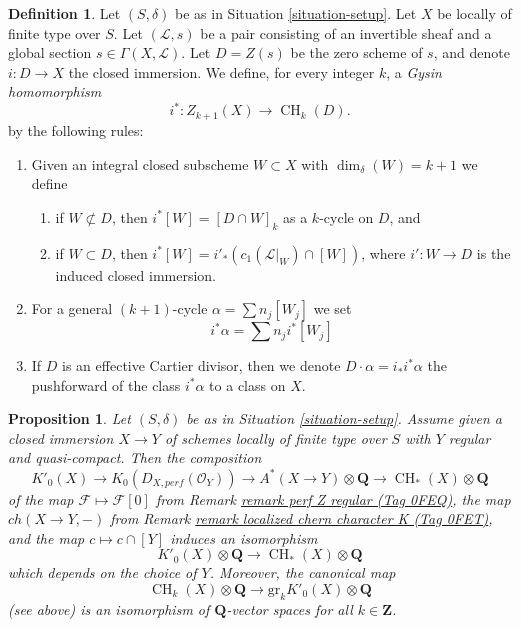 \documentclass{amsart}
\theoremstyle{plain}
\newtheorem{proposition}[subsection]{Proposition}
\theoremstyle{definition}
\newtheorem{definition}[subsection]{Definition}
\theoremstyle{remark}
\numberwithin{equation}{subsection}
\def\CH{\mathop{\mathrm{CH}}\nolimits}
\begin{document}
\begin{definition}
\label{definition-gysin-homomorphism}
Let $(S, \delta)$ be as in Situation \ref{situation-setup}.
Let $X$ be locally of finite type over $S$.
Let $(\mathcal{L}, s)$ be a pair consisting of an invertible
sheaf and a global section $s \in \Gamma(X, \mathcal{L})$.
Let $D = Z(s)$ be the zero scheme of $s$, and
denote $i : D \to X$ the closed immersion.
We define, for every integer $k$, a {\it Gysin homomorphism}
$$
i^* : Z_{k + 1}(X) \to \CH_k(D).
$$
by the following rules:
\begin{enumerate}
\item Given an integral closed subscheme $W \subset X$ with
$\dim_\delta(W) = k + 1$ we define
\begin{enumerate}
\item if $W \not \subset D$, then $i^*[W] = [D \cap W]_k$ as a
$k$-cycle on $D$, and
\item if $W \subset D$, then
$i^*[W] = i'_*(c_1(\mathcal{L}|_W) \cap [W])$,
where $i' : W \to D$ is the induced closed immersion.
\end{enumerate}
\item For a general $(k + 1)$-cycle $\alpha = \sum n_j[W_j]$
we set
$$
i^*\alpha = \sum n_j i^*[W_j]
$$
\item If $D$ is an effective Cartier divisor, then we denote
$D \cdot \alpha = i_*i^*\alpha$ the pushforward of the class $i^*\alpha$
to a class on $X$.
\end{enumerate}
\end{definition}

\begin{proposition}
\label{proposition-K-tensor-Q}
Let $(S, \delta)$ be as in Situation \ref{situation-setup}. Assume given a
closed immersion $X \to Y$ of schemes locally of finite type over $S$
with $Y$ regular and quasi-compact. Then the composition
$$
K'_0(X) \to
K_0(D_{X, perf}(\mathcal{O}_Y)) \to
A^*(X \to Y) \otimes \mathbf{Q} \to
\CH_*(X) \otimes \mathbf{Q}
$$
of the map $\mathcal{F} \mapsto \mathcal{F}[0]$ from
Remark \href{https://stacks.math.columbia.edu/tag/0FEQ}{remark perf Z regular (Tag 0FEQ)}, the map $ch(X \to Y, -)$ from
Remark \href{https://stacks.math.columbia.edu/tag/0FET}{remark localized chern character K (Tag 0FET)}, and
the map $c \mapsto c \cap [Y]$ induces an isomorphism
$$
K'_0(X) \otimes \mathbf{Q}
\longrightarrow
\CH_*(X) \otimes \mathbf{Q}
$$
which depends on the choice of $Y$. Moreover, the canonical map
$$
\CH_k(X) \otimes \mathbf{Q}
\longrightarrow
\text{gr}_k K'_0(X) \otimes \mathbf{Q}
$$
(see above) is an isomorphism of $\mathbf{Q}$-vector spaces for all
$k \in \mathbf{Z}$.
\end{proposition}
\end{document}
